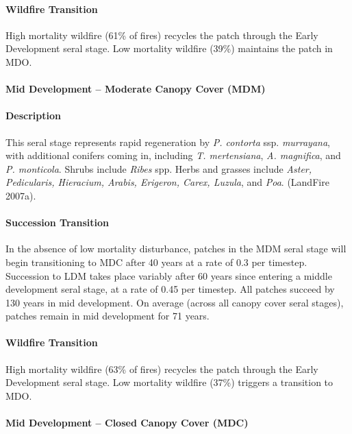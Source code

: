 \paragraph{Wildfire Transition} High mortality wildfire (61\% of fires) recycles the patch through the Early Development seral stage. Low mortality wildfire (39\%) maintains the patch in MDO.

\noindent\hrulefill

\paragraph{Mid Development – Moderate Canopy Cover (MDM)}

\paragraph{Description} This seral stage represents rapid regeneration by \emph{P. contorta} ssp. \emph{murrayana}, with additional conifers coming in, including \emph{T. mertensiana}, \emph{A. magnifica}, and \emph{P. monticola}. Shrubs include \emph{Ribes} spp. Herbs and grasses include \emph{Aster, Pedicularis, Hieracium, Arabis, Erigeron, Carex, Luzula}, and \emph{Poa}. (LandFire 2007a).

\paragraph{Succession Transition} In the absence of low mortality disturbance, patches in the MDM seral stage will begin transitioning to MDC after 40 years at a rate of 0.3 per timestep. Succession to LDM takes place variably after 60 years since entering a middle development seral stage, at a rate of 0.45 per timestep. All patches succeed by 130 years in mid development.  On average (across all canopy cover seral stages), patches remain in mid development for 71 years.
 
\paragraph{Wildfire Transition} High mortality wildfire (63\% of fires) recycles the patch through the Early Development seral stage. Low mortality wildfire (37\%) triggers a transition to MDO.

\noindent\hrulefill

\paragraph{Mid Development – Closed Canopy Cover (MDC)}

